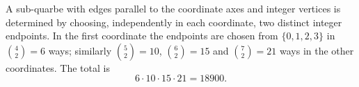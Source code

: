 A sub-quarbe with edges parallel to the coordinate axes and integer vertices is determined by choosing, independently in each coordinate, two distinct integer endpoints. In the first coordinate the endpoints are chosen from $\{0,1,2,3\}$ in $\binom42=6$ ways; similarly $\binom52=10$, $\binom62=15$ and $\binom72=21$ ways in the other coordinates. The total is
\[
6\cdot10\cdot15\cdot21=\boxed{18900}.
\]
